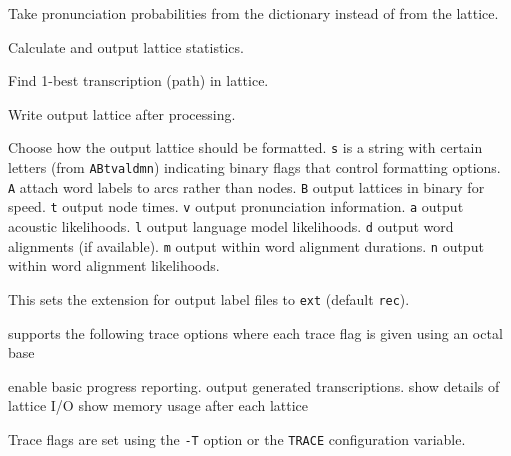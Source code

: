 \begin{optlist}
   Take pronunciation probabilities from the dictionary
  instead of from the lattice.

   Calculate and output lattice statistics.

   Find 1-best transcription (path) in lattice.

   Write output lattice after processing.

   Choose how the output lattice should be formatted.
         \texttt{s} is a string with certain letters (from \texttt{ABtvaldmn})
         indicating binary flags that control formatting options.
         \texttt{A} attach word labels to arcs rather than nodes.
         \texttt{B} output lattices in binary for speed.
         \texttt{t} output node times.
         \texttt{v} output pronunciation information.
         \texttt{a} output acoustic likelihoods.
         \texttt{l} output language model likelihoods.
         \texttt{d} output word alignments (if available).
         \texttt{m} output within word alignment durations.
         \texttt{n} output within word alignment likelihoods.

    This sets the extension for output label files to
        \texttt{ext} (default \texttt{rec}).

\stdoptF
\stdoptG
\stdoptH
\stdoptI
\stdoptJ
\stdoptK
\stdoptP

\end{optlist}


 supports the following trace options where each
trace flag is given using an octal base
\begin{optlist}
    enable basic progress reporting.  
    output generated transcriptions.
    show details of lattice I/O
    show memory usage after each lattice
\end{optlist}
Trace flags are set using the \texttt{-T} option or the \texttt{TRACE} 
configuration variable.


